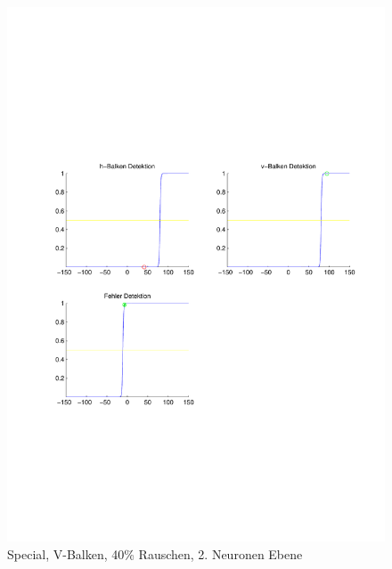 \begin{figure}[hbt]
\begin{minipage}{0.8 \textwidth}
		\includegraphics[width=\textwidth]{./Bilder/Auswertung/Endergebnis/TypeSpecial_Rauschen40_v_Line_Layer2}
		\caption{Special, V-Balken, 40\% Rauschen, 2. Neuronen Ebene}
		\label{Special_V_40_2}
	\end{minipage}
\end{figure}

